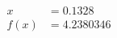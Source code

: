 \documentclass[preview]{standalone}
\begin{document}
\begin{align*}
x &= 0.1328\\f(x) &= 4.2380346
\end{align*}
\end{document}
